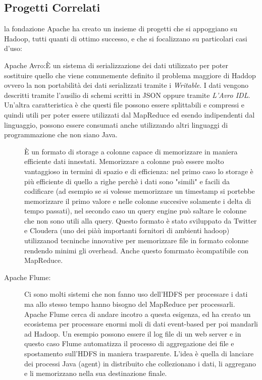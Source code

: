 \subsection{Progetti Correlati}
la fondazione Apache ha creato un insieme di progetti che si appoggiano su Hadoop, tutti quanti di ottimo successo, e che si focalizzano su particolari casi d'uso:
\begin{description}
  \item[Apache Avro:È un sistema di serializzazione dei dati utilizzato per poter sostituire quello che viene comunemente definito il problema maggiore di Haddop ovvero la non portabilità dei dati serializzati tramite i \textit{Writable}. I dati vengono descritti tramite l'ausilio di schemi scritti in JSON oppure tramite \textit{L'Avro IDL}. Un'altra caratteristica è che questi file possono essere splittabili e compressi e quindi utili per poter essere utilizzati dal MapReduce ed esendo indipendenti dal linguaggio, possono essere consumati anche utilizzando altri linguaggi di programmazione che non siano Java.
  \item[Apache Parquet:] È un formato di storage a colonne capace di memorizzare in maniera efficiente dati innestati. Memorizzare a colonne può essere molto vantaggioso in termini di spazio e di efficienza: nel primo caso lo storage è più efficiente di quello a righe perchè i dati sono "simili" e facili da codificare (ad esempio se si volesse memorizzare un timestamp si portebbe memorizzare il primo valore e nelle colonne succesive solamente i delta di tempo passati), nel secondo caso un query engine può saltare le colonne che non sono utili alla query. Questo formato è stato sviluppato da Twitter e Cloudera (uno dei piàù importanti fornitori di ambienti hadoop) utilizzanod tecninche innovative per memorizzare file in formato colonne rendendo minimi gli overhead. Anche questo fomrmato ècompatibile con MapReduce.
  \item[Apache Flume:] Ci sono molti sistemi che non fanno uso dell'HDFS per processare i dati ma allo stesso tempo hanno bisogno del MapReduce per processarli. Apache Flume cerca di andare incotro a questa esigenza, ed ha creato un ecosistema per processare enormi moli di dati event-based per poi mandarli ad Hadoop. Un esempio possono essere il log file di un web server e in questo caso Flume automatizza il processo di aggregazione dei file e spostamento sull'HDFS in maniera trasparente. L'idea è quella di lanciare dei processi Java (agent) in distribuito che collezionano i dati, li aggregano e li memorizzano nella sua destinazione finale.

\end{description}
